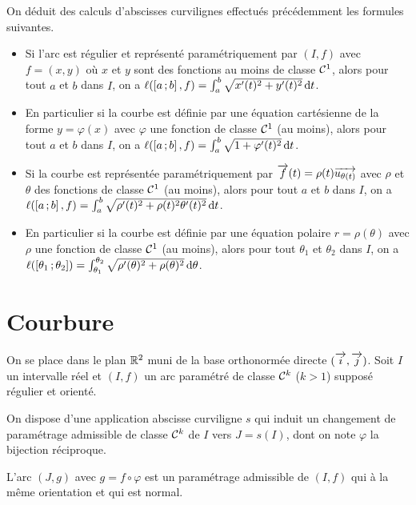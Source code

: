 On déduit des calculs d'abscisses curvilignes effectués précédemment les 
formules suivantes.
\begin{itemize}
  \item Si l'arc est régulier et représenté paramétriquement par \((I, f)\) avec 
    \(f=(x,y)\) où \(x\) et \(y\) sont des fonctions au moins de classe 
    \(\mathcal{C}^{1}\), alors pour tout \(a\) et \(b\) dans \(I\), on a 
    \(\ell(\left[ a \, ;  b \right],f)=\int_a^b\sqrt{x'(t)^2+y'(t)^2}\mathop{}\mathopen{}\mathrm{d} t\).
  \item En particulier si la courbe est définie par une équation cartésienne de 
    la forme \(y=\varphi(x)\) avec \(\varphi\) une fonction de classe 
    \(\mathcal{C}^{1}\) (au moins), alors pour tout \(a\) et \(b\) dans \(I\), on a 
    \(\ell(\left[ a \, ;  b \right],f)=\int_a^b\sqrt{1+\varphi'(t)^2}\mathop{}\mathopen{}\mathrm{d} t\).
  \item Si la courbe est représentée paramétriquement par 
    \(\overrightarrow{f}(t)=\rho(t)\overrightarrow{u_{\theta(t)}}\) avec \(\rho\) et \(\theta\) des 
    fonctions de classe \(\mathcal{C}^{1}\) (au moins), alors pour tout \(a\) et 
    \(b\) dans \(I\), on a 
    \(\ell(\left[ a \, ;  b \right],f)=\int_a^b\sqrt{\rho'(t)^2+\rho(t)^2\theta'(t)^2}\mathop{}\mathopen{}\mathrm{d} 
    t\).
  \item En particulier si la courbe est définie par une équation polaire 
    \(r=\rho(\theta)\) avec \(\rho\) une fonction de classe \(\mathcal{C}^{1}\) (au 
    moins), alors pour tout \(\theta_1\) et \(\theta_2\) dans \(I\), on a 
    \(\ell(\left[ \theta_1 \, ;  \theta_2 \right])=\int_{\theta_1}^{\theta_2}\sqrt{\rho'(\theta)^2+\rho(\theta)^2}\mathop{}\mathopen{}\mathrm{d} 
    \theta\).
\end{itemize}

\section{Courbure}

On se place dans le plan \(\mathbb{R}^2\) muni de la base orthonormée directe \((\overrightarrow{i}, 
\overrightarrow{j})\). Soit \(I\) un intervalle réel et \((I,f)\) un arc paramétré de classe 
\(\mathcal{C}^{k}\) (\(k>1\)) supposé régulier et orienté. 

On dispose d'une application abscisse curviligne \(s\) qui induit un changement 
de paramétrage admissible de classe \(\mathcal{C}^{k}\) de \(I\) vers \(J=s(I)\), 
dont on note \(\varphi\) la bijection réciproque.

L'arc \((J, g)\) avec \(g=f \circ \varphi\) est un paramétrage admissible de 
\((I,f)\) qui à la même orientation et qui est normal.

